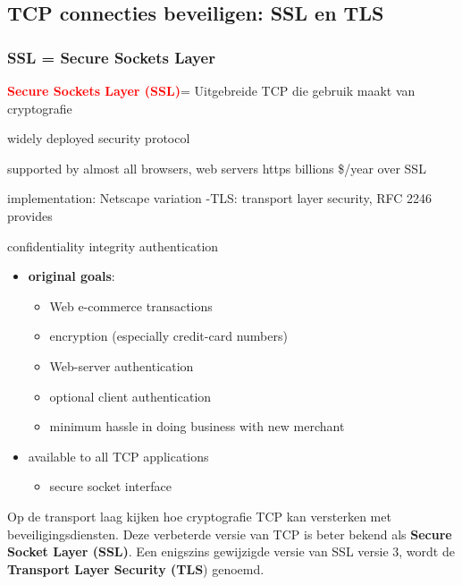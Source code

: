 \subsection{TCP connecties beveiligen: SSL en TLS}

\subsubsection{SSL = Secure Sockets Layer}

\textcolor{red}{\textbf{Secure Sockets Layer (SSL)}}=  Uitgebreide TCP die gebruik maakt van cryptografie

\begin{multicols}{2}
\bi
\itf widely deployed security protocol

\bi
\itf supported by almost all browsers, web servers
\itf https
\itf billions \$/year over SSL
    \ei

    \itf implementation: Netscape
    \itf variation -TLS: transport layer security, RFC 2246
    \itf provides

    \bi
    \itf confidentiality
    \itf integrity
    \itf authentication
    \ei
\ei
\end{multicols}


\begin{itemize}
\item \textbf{original goals}:
    \begin{itemize}
    \item Web e-commerce transactions 
    \item encryption (especially credit-card numbers)
    \item Web-server authentication
    \item optional client authentication
    \item minimum hassle in doing business with new merchant
    \end{itemize}
\item available to all TCP applications
    \begin{itemize}
    \item secure socket interface
    \end{itemize}
\end{itemize}


\noindent Op de transport laag kijken hoe cryptografie TCP kan versterken met beveiligingsdiensten. Deze verbeterde versie van TCP is beter bekend als \textbf{Secure Socket Layer (SSL)}. Een enigszins gewijzigde versie van SSL versie 3, wordt de \textbf{Transport Layer Security (TLS}) genoemd.

